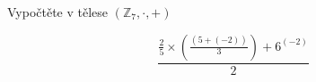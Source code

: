Vypočtěte v tělese $(\mathbb{Z}_{7}, \cdot ,+)$

$$\frac{\frac{2}{5}\times \left ( \frac{\left ( 5+(-2) \right )}{3} \right )+6^{(-2)}}{2}$$
